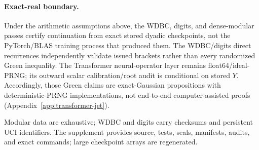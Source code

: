 \documentclass{article}
\begin{document}
\paragraph{Exact-real boundary.}
Under the arithmetic assumptions above, the WDBC, digits, and dense-modular
passes certify continuation from exact stored dyadic checkpoints, not the
PyTorch/BLAS training process that produced them.  The
WDBC/digits direct recurrences independently validate issued brackets rather
than every randomized Green inequality.  The Transformer neural-operator layer
remains float64/ideal-PRNG; its outward scalar calibration/root audit is
conditional on stored $Y$.  Accordingly, those Green claims are exact-Gaussian
propositions with deterministic-PRNG implementations, not end-to-end
computer-assisted proofs (Appendix~\ref{app:transformer-jet}).

Modular data are exhaustive; WDBC and digits carry checksums and persistent UCI
identifiers.  The supplement provides source, tests, seals, manifests, audits,
and exact commands; large checkpoint arrays are regenerated.

\ifdefined\arxivversion\else

\fi
\end{document}
